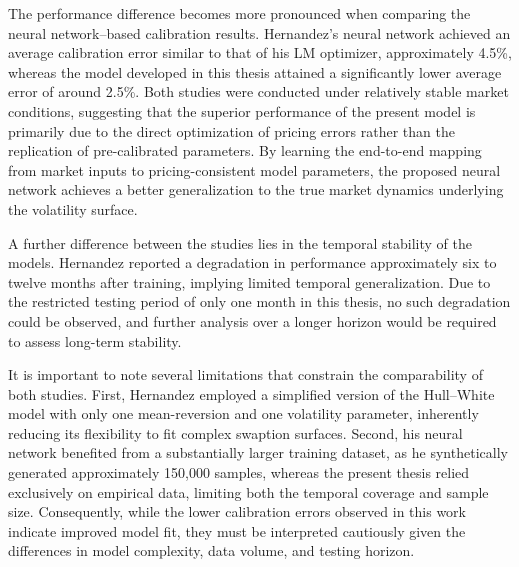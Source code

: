 The performance difference becomes more pronounced when comparing the neural network–based calibration results. Hernandez’s neural network achieved an average calibration error similar to that of his LM optimizer, approximately 4.5\%, whereas the model developed in this thesis attained a significantly lower average error of around 2.5\%. Both studies were conducted under relatively stable market conditions, suggesting that the superior performance of the present model is primarily due to the direct optimization of pricing errors rather than the replication of pre-calibrated parameters. By learning the end-to-end mapping from market inputs to pricing-consistent model parameters, the proposed neural network achieves a better generalization to the true market dynamics underlying the volatility surface.

A further difference between the studies lies in the temporal stability of the models. Hernandez reported a degradation in performance approximately six to twelve months after training, implying limited temporal generalization. Due to the restricted testing period of only one month in this thesis, no such degradation could be observed, and further analysis over a longer horizon would be required to assess long-term stability.

It is important to note several limitations that constrain the comparability of both studies. First, Hernandez employed a simplified version of the Hull--White model with only one mean-reversion and one volatility parameter, inherently reducing its flexibility to fit complex swaption surfaces. Second, his neural network benefited from a substantially larger training dataset, as he synthetically generated approximately 150,000 samples, whereas the present thesis relied exclusively on empirical data, limiting both the temporal coverage and sample size. Consequently, while the lower calibration errors observed in this work indicate improved model fit, they must be interpreted cautiously given the differences in model complexity, data volume, and testing horizon.
